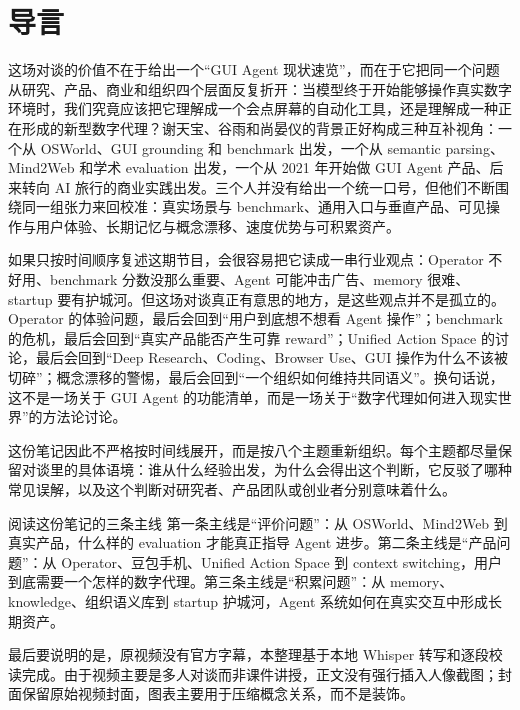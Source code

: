 \section*{导言}

这场对谈的价值不在于给出一个“GUI Agent 现状速览”，而在于它把同一个问题从研究、产品、商业和组织四个层面反复折开：当模型终于开始能够操作真实数字环境时，我们究竟应该把它理解成一个会点屏幕的自动化工具，还是理解成一种正在形成的新型数字代理？谢天宝、谷雨和尚晏仪的背景正好构成三种互补视角：一个从 OSWorld、GUI grounding 和 benchmark 出发，一个从 semantic parsing、Mind2Web 和学术 evaluation 出发，一个从 2021 年开始做 GUI Agent 产品、后来转向 AI 旅行的商业实践出发。三个人并没有给出一个统一口号，但他们不断围绕同一组张力来回校准：真实场景与 benchmark、通用入口与垂直产品、可见操作与用户体验、长期记忆与概念漂移、速度优势与可积累资产。

如果只按时间顺序复述这期节目，会很容易把它读成一串行业观点：Operator 不好用、benchmark 分数没那么重要、Agent 可能冲击广告、memory 很难、startup 要有护城河。但这场对谈真正有意思的地方，是这些观点并不是孤立的。Operator 的体验问题，最后会回到“用户到底想不想看 Agent 操作”；benchmark 的危机，最后会回到“真实产品能否产生可靠 reward”；Unified Action Space 的讨论，最后会回到“Deep Research、Coding、Browser Use、GUI 操作为什么不该被切碎”；概念漂移的警惕，最后会回到“一个组织如何维持共同语义”。换句话说，这不是一场关于 GUI Agent 的功能清单，而是一场关于“数字代理如何进入现实世界”的方法论讨论。

这份笔记因此不严格按时间线展开，而是按八个主题重新组织。每个主题都尽量保留对谈里的具体语境：谁从什么经验出发，为什么会得出这个判断，它反驳了哪种常见误解，以及这个判断对研究者、产品团队或创业者分别意味着什么。

\begin{importantbox}{阅读这份笔记的三条主线}
第一条主线是“评价问题”：从 OSWorld、Mind2Web 到真实产品，什么样的 evaluation 才能真正指导 Agent 进步。第二条主线是“产品问题”：从 Operator、豆包手机、Unified Action Space 到 context switching，用户到底需要一个怎样的数字代理。第三条主线是“积累问题”：从 memory、knowledge、组织语义库到 startup 护城河，Agent 系统如何在真实交互中形成长期资产。
\end{importantbox}

最后要说明的是，原视频没有官方字幕，本整理基于本地 Whisper 转写和逐段校读完成。由于视频主要是多人对谈而非课件讲授，正文没有强行插入人像截图；封面保留原始视频封面，图表主要用于压缩概念关系，而不是装饰。

